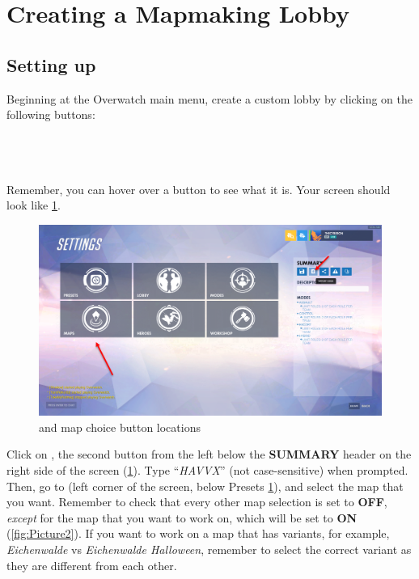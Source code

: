 \documentclass[12pt,a4paper]{article}
\begin{document}
\newpage
\section{Creating a Mapmaking Lobby}
    
    \subsection{Setting up}
        Beginning at the Overwatch main menu, create a custom lobby by clicking on the following buttons:\\ \\
        \centerline{}\\ \\
        Remember, you can hover over a button to see what it is.
        Your screen should look like \cref{fig:Picture1}.
    
        \begin{figure}[ht]
            \centering
            \includegraphics[width=\textwidth,height=\textheight,keepaspectratio]{Picture1.png}
            \caption{ and map choice button locations}
            \label{fig:Picture1}
        \end{figure}
    
        Click on , the second button from the left below the \textbf{SUMMARY} header on the right side of the screen (\cref{fig:Picture1}). Type ``\textit{HAVVX}'' (not case-sensitive) when prompted. Then, go to  (left corner of the screen, below Presets \cref{fig:Picture1}), and select the map that you want. Remember to check that every other map selection is set to \textbf{OFF}, \emph{except} for the map that you want to work on, which will be set to \textbf{ON} (\cref{fig:Picture2}). If you want to work on a map that has variants, for example, \emph{Eichenwalde} vs \emph{Eichenwalde Halloween}, remember to select the correct variant as they are different from each other.
        
\end{document}

